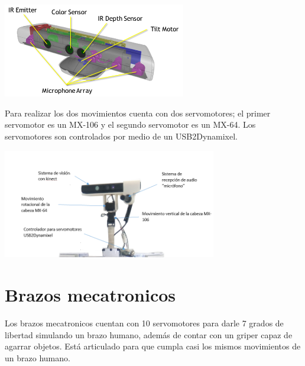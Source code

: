 \documentclass[user_manual.tex]{subfiles}
\begin{document}
\begin{center}
\includegraphics[width=0.6\textwidth]{Figures/Hardware/Partes/Kinect_sensors.png}
\label{fig:Hardware:Diagramas:Justina:Vision:Kinect}
\end{center}

Para realizar los dos movimientos cuenta con dos servomotores; el primer servomotor es un MX-106 y el segundo servomotor es un MX-64. Los servomotores son controlados por medio de un USB2Dynamixel.

\begin{center}
\includegraphics[width=0.7\textwidth]{Figures/Hardware/Diagramas/Cabeza.png}
\label{fig:Hardware:Diagramas:Justina:Completa}
\end{center}

\newpage
\section{Brazos mecatronicos}
Los brazos mecatronicos cuentan con 10 servomotores para darle 7 grados de libertad simulando un brazo humano, además de contar con un griper capaz de agarrar objetos. Está articulado para que cumpla casi los mismos movimientos de un brazo humano.
\end{document}
